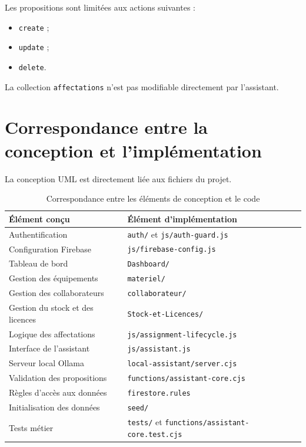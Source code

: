 \documentclass{rapportENSIAS}
\begin{document}
Les propositions sont limitées aux actions suivantes :

\begin{itemize}
    \item \texttt{create} ;
    \item \texttt{update} ;
    \item \texttt{delete}.
\end{itemize}

La collection \texttt{affectations} n’est pas modifiable directement par l’assistant.

\section{Correspondance entre la conception et l’implémentation}

La conception UML est directement liée aux fichiers du projet.

\begin{table}[H]
    \centering
    \caption{Correspondance entre les éléments de conception et le code}
    \label{tab:correspondance}
    \begin{tabular}{|p{5cm}|p{8cm}|}
        \hline
        \textbf{Élément conçu} & \textbf{Élément d’implémentation} \\
        \hline
        Authentification & \texttt{auth/} et \texttt{js/auth-guard.js} \\
        \hline
        Configuration Firebase & \texttt{js/firebase-config.js} \\
        \hline
        Tableau de bord & \texttt{Dashboard/} \\
        \hline
        Gestion des équipements & \texttt{materiel/} \\
        \hline
        Gestion des collaborateurs & \texttt{collaborateur/} \\
        \hline
        Gestion du stock et des licences & \texttt{Stock-et-Licences/} \\
        \hline
        Logique des affectations & \texttt{js/assignment-lifecycle.js} \\
        \hline
        Interface de l’assistant & \texttt{js/assistant.js} \\
        \hline
        Serveur local Ollama & \texttt{local-assistant/server.cjs} \\
        \hline
        Validation des propositions & \texttt{functions/assistant-core.cjs} \\
        \hline
        Règles d’accès aux données & \texttt{firestore.rules} \\
        \hline
        Initialisation des données & \texttt{seed/} \\
        \hline
        Tests métier & \texttt{tests/} et \newline \texttt{functions/assistant-core.test.cjs} \\
        \hline
    \end{tabular}
\end{table}
\end{document}
